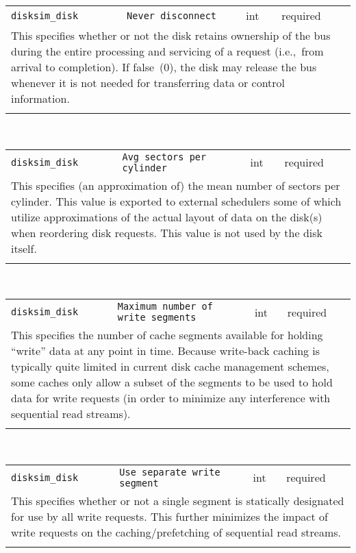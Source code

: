 \noindent 
\begin{tabular}{|p{\lpmodwidth}|p{\lpnamewidth}|p{0.5in}|p{0.5in}|}
\cline{1-4}
\texttt{disksim\_disk} & \texttt{Never disconnect} & int & required \\ 
\cline{1-4}
\multicolumn{4}{|p{6in}|}{
This specifies whether or not the disk retains ownership of the bus during
the entire processing and servicing of a request (i.e.,~from arrival
to completion). If false~(0), the disk may release the bus whenever
it is not needed for transferring data or control information.
}\\ 
\cline{1-4}
\multicolumn{4}{p{5in}}{}\\
\end{tabular}\\ 
\noindent 
\begin{tabular}{|p{\lpmodwidth}|p{\lpnamewidth}|p{0.5in}|p{0.5in}|}
\cline{1-4}
\texttt{disksim\_disk} & \texttt{Avg sectors per cylinder} & int & required \\ 
\cline{1-4}
\multicolumn{4}{|p{6in}|}{
This specifies (an approximation of) the mean number of sectors per
cylinder. This value is exported to external schedulers some of which
utilize approximations of the actual layout of data on the disk(s)
when reordering disk requests. This value is not used by the disk
itself.
}\\ 
\cline{1-4}
\multicolumn{4}{p{5in}}{}\\
\end{tabular}\\ 
\noindent 
\begin{tabular}{|p{\lpmodwidth}|p{\lpnamewidth}|p{0.5in}|p{0.5in}|}
\cline{1-4}
\texttt{disksim\_disk} & \texttt{Maximum number of write segments} & int & required \\ 
\cline{1-4}
\multicolumn{4}{|p{6in}|}{
This specifies the number of cache segments available for holding
``write'' data at any point in time. Because write-back caching is
typically quite limited in current disk cache management schemes, some
caches only allow a subset of the segments to be used to hold data for
write requests (in order to minimize any interference with sequential
read streams).
}\\ 
\cline{1-4}
\multicolumn{4}{p{5in}}{}\\
\end{tabular}\\ 
\noindent 
\begin{tabular}{|p{\lpmodwidth}|p{\lpnamewidth}|p{0.5in}|p{0.5in}|}
\cline{1-4}
\texttt{disksim\_disk} & \texttt{Use separate write segment} & int & required \\ 
\cline{1-4}
\multicolumn{4}{|p{6in}|}{
This specifies whether or not a single segment is statically designated
for use by all write requests. This further minimizes the impact of
write requests on the caching/prefetching of sequential read streams.
}\\ 
\cline{1-4}
\multicolumn{4}{p{5in}}{}\\
\end{tabular}\\ 
